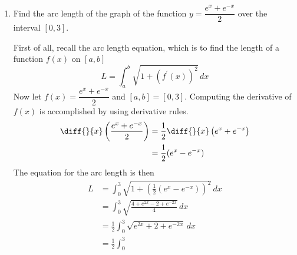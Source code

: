 \documentclass{article}
\begin{document}
\begin{enumerate}[label=\textbf{(6.\arabic*)}]
\item Find the arc length of the graph of the function $y=\dfrac{e^x+e^{-x}}{2}$ over the interval $[0,3]$.

First of all, recall the arc length equation, which is to find the length of a function $f(x)$ on $[a,b]$
\[L=\int_a^b\!\sqrt{1+\left(f^\prime(x)\right)^2}\,dx\]
Now let $f(x)=\dfrac{e^x+e^{-x}}{2}$ and $[a,b]=[0,3]$. Computing the derivative of $f(x)$ is accomplished by using derivative rules.
\begin{align*}
\diff{}{x}\left(\frac{e^x+e^{-x}}{2}\right) &= \frac{1}{2}\diff{}{x}\left(e^x+e^{-x}\right)\\
&= \frac{1}{2}(e^x-e^{-x})
\end{align*}
The equation for the arc length is then
\begin{align*}
L &= \int_0^3\!\sqrt{1+\left(\frac{1}{2}(e^x-e^{-x})\right)^2}\,dx \\
&= \int_0^3\!\sqrt{\frac{4+e^{2x}-2+e^{-2x}}{4}}\,dx\\
&= \frac{1}{2}\int_0^3\!\sqrt{e^{2x}+2+e^{-2x}}\,dx\\
&= \frac{1}{2}\int_0^3\!
\end{align*}


\end{enumerate}
\end{document}
